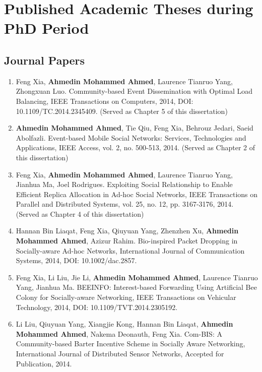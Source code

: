 \chapter*{\hfill Published Academic Theses during PhD Period \hfill}

\renewcommand{\labelenumi}{[\arabic{enumi}]}
\section*{Journal Papers}
\begin{enumerate}
\item
Feng Xia, \textbf{Ahmedin Mohammed Ahmed}, Laurence Tianruo Yang, Zhongxuan Luo. Community-based Event Dissemination with Optimal Load Balancing, IEEE Transactions on Computers, 2014, DOI: 10.1109/TC.2014.2345409. (Served as Chapter 5 of this dissertation)

\item
\textbf{Ahmedin Mohammed Ahmed}, Tie Qiu, Feng Xia, Behrouz Jedari, Saeid Abolfazli. Event-based Mobile Social Networks: Services, Technologies and Applications, IEEE Access, vol. 2, no. 500-513, 2014. (Served as Chapter 2 of this dissertation)

\item
Feng Xia, \textbf{Ahmedin Mohammed Ahmed}, Laurence Tianruo Yang, Jianhua Ma, Joel Rodrigues. Exploiting Social Relationship to Enable Efficient Replica Allocation in Ad-hoc Social Networks, IEEE Transactions on Parallel and Distributed Systems, vol. 25, no. 12, pp. 3167-3176, 2014. (Served as Chapter 4 of this dissertation)

\item
Hannan Bin Liaqat, Feng Xia, Qiuyuan Yang, Zhenzhen Xu, \textbf{Ahmedin Mohammed Ahmed}, Azizur Rahim. Bio-inspired Packet Dropping in Socially-aware Ad-hoc Networks, International Journal of Communication Systems, 2014, DOI: 10.1002/dac.2857.

\item
Feng Xia, Li Liu, Jie Li, \textbf{Ahmedin Mohammed Ahmed}, Laurence Tianruo Yang, Jianhua Ma. BEEINFO: Interest-based Forwarding Using Artificial Bee Colony for Socially-aware Networking, IEEE Transactions on Vehicular Technology, 2014, DOI: 10.1109/TVT.2014.2305192.

\item
Li Liu, Qiuyuan Yang, Xiangjie Kong, Hannan Bin Liaqat, \textbf{Ahmedin Mohammed Ahmed}, Nakema Deonauth, Feng Xia. Com-BIS: A Community-based Barter Incentive Scheme in Socially Aware Networking, International Journal of Distributed Sensor Networks, Accepted for Publication, 2014.


\end{enumerate}
